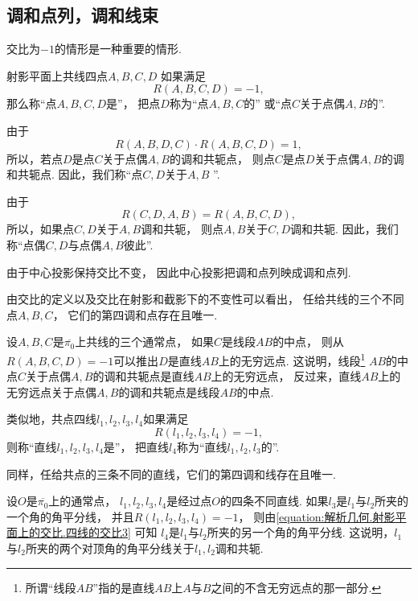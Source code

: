 \subsection{调和点列，调和线束}
交比为\(-1\)的情形是一种重要的情形.
\begin{definition}
射影平面上共线四点\(A,B,C,D\)
如果满足\begin{equation*}
	R(A,B,C,D) = -1,
\end{equation*}
那么称“点\(A,B,C,D\)是”，
把点\(D\)称为“点\(A,B,C\)的”
或“点\(C\)关于点偶\(A,B\)的”.
\end{definition}

由于\begin{equation*}
	R(A,B,D,C) \cdot R(A,B,C,D) = 1,
\end{equation*}
所以，若点\(D\)是点\(C\)关于点偶\(A,B\)的调和共轭点，
则点\(C\)是点\(D\)关于点偶\(A,B\)的调和共轭点.
因此，我们称“点\(C,D\)关于\(A,B\) ”.

由于\begin{equation*}
	R(C,D,A,B)
	= R(A,B,C,D),
\end{equation*}
所以，如果点\(C,D\)关于\(A,B\)调和共轭，
则点\(A,B\)关于\(C,D\)调和共轭.
因此，我们称“点偶\(C,D\)与点偶\(A,B\)彼此”.

由于中心投影保持交比不变，
因此中心投影把调和点列映成调和点列.

由交比的定义以及交比在射影和截影下的不变性可以看出，
任给共线的三个不同点\(A,B,C\)，
它们的第四调和点存在且唯一.

设\(A,B,C\)是\(\overline{\pi_0}\)上共线的三个通常点，
如果\(C\)是线段\(AB\)的中点，
则从\(R(A,B,C,D) = -1\)可以推出\(D\)是直线\(AB\)上的无穷远点.
这说明，线段\footnote{
	所谓“线段\(AB\)”指的是直线\(AB\)上\(A\)与\(B\)之间的不含无穷远点的那一部分.
}%
\(AB\)的中点\(C\)关于点偶\(A,B\)的调和共轭点是直线\(AB\)上的无穷远点，
反过来，直线\(AB\)上的无穷远点关于点偶\(A,B\)的调和共轭点是线段\(AB\)的中点.

类似地，共点四线\(l_1,l_2,l_3,l_4\)如果满足\begin{equation*}
	R(l_1,l_2,l_3,l_4) = -1,
\end{equation*}
则称“直线\(l_1,l_2,l_3,l_4\)是”，
把直线\(l_4\)称为“直线\(l_1,l_2,l_3\)的”.

同样，任给共点的三条不同的直线，它们的第四调和线存在且唯一.

设\(O\)是\(\overline{\pi_0}\)上的通常点，
\(l_1,l_2,l_3,l_4\)是经过点\(O\)的四条不同直线.
如果\(l_3\)是\(l_1\)与\(l_2\)所夹的一个角的角平分线，
并且\(R(l_1,l_2,l_3,l_4) = -1\)，
则由\cref{equation:解析几何.射影平面上的交比.四线的交比3} 可知
\(l_4\)是\(l_1\)与\(l_2\)所夹的另一个角的角平分线.
这说明，\(l_1\)与\(l_2\)所夹的两个对顶角的角平分线关于\(l_1,l_2\)调和共轭.

